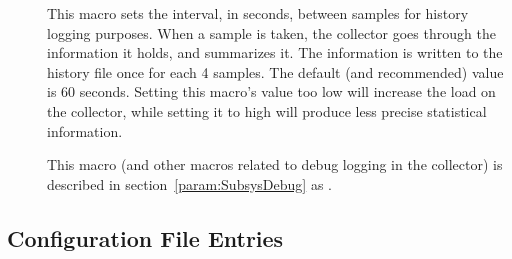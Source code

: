 \begin{description}
\item[]
  \label{param:PoolHistorySamplingInterval}
  This macro sets the interval, in seconds, between samples for
  history logging purposes. 
  When a sample is taken, the collector goes through the information
  it holds, and summarizes it.
  The information is written to the history file once for each 4
  samples.
  The default (and recommended) value is 60 seconds. Setting this
  macro's value too low will increase the load on the collector,
  while setting it to high will produce less precise statistical
  information.

\item[] \label{param:CollectorDebug} This
  macro (and other macros related to debug logging in the
  collector) is described in section~\ref{param:SubsysDebug} as
  .

\end{description}

\subsection{\label{sec:Negotiator-Config-File-Entries}
 Configuration File Entries}


